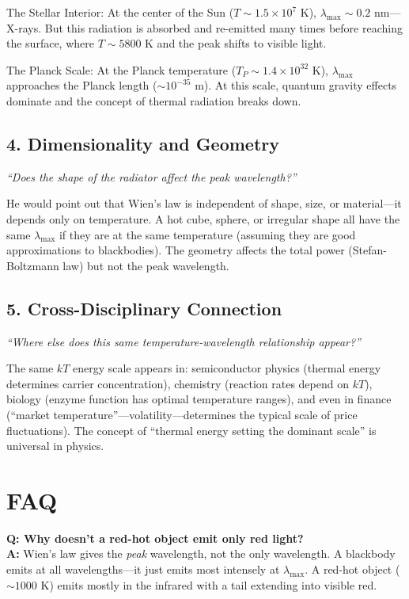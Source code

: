 The Stellar Interior: At the center of the Sun ($T \sim 1.5 \times 10^7$ K), $\lambda_{\max} \sim 0.2$ nm---X-rays. But this radiation is absorbed and re-emitted many times before reaching the surface, where $T \sim 5800$ K and the peak shifts to visible light.

The Planck Scale: At the Planck temperature ($T_P \sim 1.4 \times 10^{32}$ K), $\lambda_{\max}$ approaches the Planck length ($\sim 10^{-35}$ m). At this scale, quantum gravity effects dominate and the concept of thermal radiation breaks down.

\subsection*{4. Dimensionality and Geometry}
\textit{``Does the shape of the radiator affect the peak wavelength?''}

He would point out that Wien's law is independent of shape, size, or material---it depends only on temperature. A hot cube, sphere, or irregular shape all have the same $\lambda_{\max}$ if they are at the same temperature (assuming they are good approximations to blackbodies). The geometry affects the total power (Stefan-Boltzmann law) but not the peak wavelength.

\subsection*{5. Cross-Disciplinary Connection}
\textit{``Where else does this same temperature-wavelength relationship appear?''}

The same $kT$ energy scale appears in: semiconductor physics (thermal energy determines carrier concentration), chemistry (reaction rates depend on $kT$), biology (enzyme function has optimal temperature ranges), and even in finance (``market temperature''---volatility---determines the typical scale of price fluctuations). The concept of ``thermal energy setting the dominant scale'' is universal in physics.
\section*{FAQ}

\textbf{Q: Why doesn't a red-hot object emit only red light?}\\
\textbf{A:} Wien's law gives the \emph{peak} wavelength, not the only wavelength. A blackbody emits at all wavelengths---it just emits most intensely at $\lambda_{\max}$. A red-hot object ($\sim 1000$ K) emits mostly in the infrared with a tail extending into visible red.

